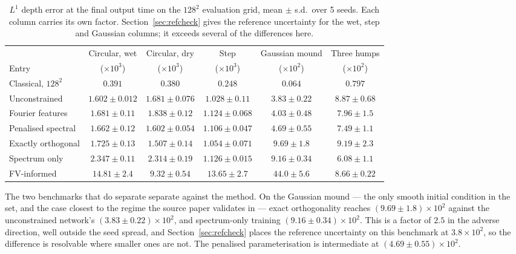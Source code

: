 \documentclass[11pt]{article}
\begin{document}
\begin{table}[htbp]
\centering\small
\caption{$L^1$ depth error at the final output time on the $128^2$ evaluation
grid, mean $\pm$ s.d.\ over 5 seeds. Each column carries its own factor.
Section~\ref{sec:refcheck} gives the reference uncertainty for the wet,
step and Gaussian columns; it exceeds several of the differences here.}
\label{tab:matrix}
\begin{tabular}{lccccc}
\toprule
 & Circular, wet & Circular, dry & Step & Gaussian mound & Three humps \\
Entry & ($\times10^{3}$) & ($\times10^{3}$) & ($\times10^{3}$) & ($\times10^{2}$) & ($\times10^{2}$) \\
\midrule
Classical, $128^2$ & $0.391$ & $0.380$ & $0.248$ & $0.064$ & $0.797$ \\
\midrule
Unconstrained      & $1.602\pm0.012$ & $1.681\pm0.076$ & $1.028\pm0.11$  & $3.83\pm0.22$ & $8.87\pm0.68$ \\
Fourier features   & $1.681\pm0.11$  & $1.838\pm0.12$  & $1.124\pm0.068$ & $4.03\pm0.48$ & $7.96\pm1.5$ \\
Penalised spectral & $1.662\pm0.12$  & $1.602\pm0.054$ & $1.106\pm0.047$ & $4.69\pm0.55$ & $7.49\pm1.1$ \\
Exactly orthogonal & $1.725\pm0.13$  & $1.507\pm0.14$  & $1.054\pm0.071$ & $9.69\pm1.8$  & $9.19\pm2.3$ \\
Spectrum only      & $2.347\pm0.11$  & $2.314\pm0.19$  & $1.126\pm0.015$ & $9.16\pm0.34$ & $6.08\pm1.1$ \\
FV-informed        & $14.81\pm2.4$   & $9.32\pm0.54$   & $13.65\pm2.7$   & $44.0\pm5.6$  & $8.66\pm0.22$ \\
\bottomrule
\end{tabular}
\end{table}

The two benchmarks that do separate separate against the method. On the
Gaussian mound --- the only smooth initial condition in the set, and the case
closest to the regime the source paper validates in --- exact orthogonality
reaches $(9.69\pm1.8)\times10^2$ against the unconstrained network's
$(3.83\pm0.22)\times10^2$, and spectrum-only training $(9.16\pm0.34)\times10^2$.
This is a factor of $2.5$ in the adverse direction, well outside the seed
spread, and Section~\ref{sec:refcheck} places the reference uncertainty on this
benchmark at $3.8\times10^2$, so the difference is resolvable where smaller ones
are not. The penalised parameterisation is intermediate at
$(4.69\pm0.55)\times10^2$.
\end{document}
